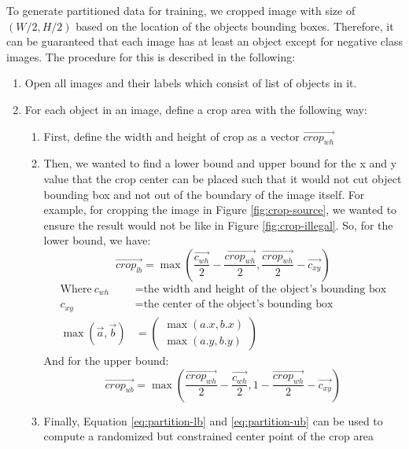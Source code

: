 To generate partitioned data for training, we cropped image with size of $(W/2,H/2)$
based on the location of the objects bounding boxes. Therefore, it can be guaranteed that each image has at least
an object except for negative class images.
The procedure for this is described in the following:
\begin{enumerate}[topsep=0pt]
  \item Open all images and their labels which consist of list of objects in it.
  \item For each object in an image, define a crop area with the following way:
  \begin{enumerate}
    \item First, define the width and height of crop as a vector $\overrightarrow{crop_{wh}}$
    \item Then, we wanted to find a lower bound and upper bound for the x and y value that the crop center can be placed such that
    it would not cut object bounding box and not out of the boundary of the image itself. For example, for cropping the 
    image in Figure \ref{fig:crop-source}, we wanted to ensure the result would not be like in Figure \ref{fig:crop-illegal}.
    So, for the lower bound, we have:
      \begin{equation}
        \overrightarrow{crop_{lb}} = \max\left (\frac{\overrightarrow{c_{wh}}}{2} - \frac{\overrightarrow{crop_{wh}}}{2}, \frac{\overrightarrow{crop_{wh}}}{2} - \overrightarrow{c_{xy}}\right )
        \label{eq:partition-lb}
      \end{equation}
      \begin{align*}
        \text{Where}~c_{wh} &= \text{the width and height of the object's bounding box}\\
        c_{xy} &= \text{the center of the object's bounding box}\\
        \max(\vec{a},\vec{b}) &= \begin{pmatrix}\max(a.x,b.x) \\ \max(a.y,b.y)\end{pmatrix}  
      \end{align*}
    And for the upper bound:
      \begin{equation}
        \overrightarrow{crop_{ub}} = \max\left (\frac{\overrightarrow{crop_{wh}}}{2} - \frac{\overrightarrow{c_{wh}}}{2}  , 1 - \frac{\overrightarrow{crop_{wh}}}{2} - \overrightarrow{c_{xy}}\right )
        \label{eq:partition-ub}
      \end{equation}
    \item Finally, Equation \ref{eq:partition-lb} and \ref{eq:partition-ub} can be used to compute a randomized but constrained center point of the crop area

\end{enumerate}
\end{enumerate}
